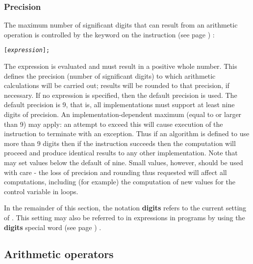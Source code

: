 \subsubsection{Precision}\label{refndi2}
 The maximum number of significant digits that can result from an
arithmetic operation is controlled by the  keyword on the
  instruction (see page \pageref{refnumeric}) :
\begin{alltt}
 [\emph{expression}];
\end{alltt}
The expression is evaluated and must result in a positive whole
number.
This defines the precision (number of significant digits) to which
arithmetic calculations will be carried out; results will be rounded to
that precision,
if necessary.
 If no expression is specified, then the default precision is used.
The default precision is 9, that is, all implementations must support
at least nine digits of precision.  An implementation-dependent maximum
(equal to or larger than 9) may apply: an attempt to exceed this will
cause execution of the instruction to terminate with an exception.
Thus if an algorithm is defined to use more than 9 digits then if
the  instruction succeeds then the computation
will proceed and produce identical results to any other implementation.
 Note that  may set values below the default of
nine.
Small values, however, should be used with care - the loss of
precision and rounding thus requested will affect all \nr{}
computations, including (for example) the computation of new values for
the control variable in loops.
 
In the remainder of this section, the notation \textbf{digits} refers
to the current setting of .
This setting may also be referred to in expressions in programs by using
the \textbf{digits}  special word (see page \pageref{refspecial}) .
\subsection{Arithmetic operators}
 
